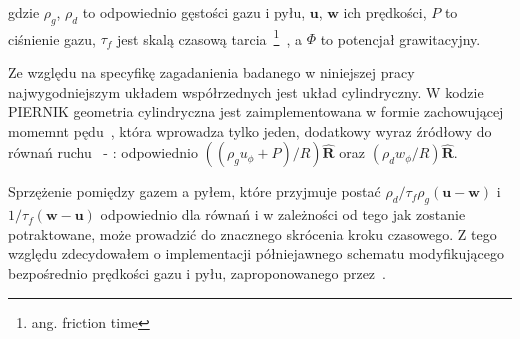 \noindent gdzie $\rho_g$, $\rho_d$ to odpowiednio gęstości gazu i pyłu,
$\mathbf{u}$, $\mathbf{w}$ ich prędkości, $P$ to ciśnienie gazu, $\tau_f$ jest
skalą czasową tarcia~\footnote{ang. friction time}~, a $\Phi$ to
potencjał grawitacyjny.

\par Ze względu na specyfikę zagadanienia badanego w niniejszej pracy
najwygodniejszym układem współrzednych jest układ cylindryczny. W kodzie
PIERNIK geometria cylindryczna jest zaimplementowana w formie zachowującej
momemnt pędu~\cite{M07,SO10}, która wprowadza tylko jeden, dodatkowy wyraz
źródłowy do równań ruchu~ - : odpowiednio
$\left((\rho_g u_\phi + P) / R\right)\mathbf{\hat{R}}$ oraz $(\rho_d w_\phi / R)
\mathbf{\hat{R}}$.
\par Sprzężenie pomiędzy gazem a pyłem, które przyjmuje postać
$\rho_d/\tau_f\rho_g(\mathbf{u}-\mathbf{w})$ i
$1/\tau_f(\mathbf{w}-\mathbf{u})$ odpowiednio dla równań  i 
 w zależności od tego jak zostanie potraktowane, może prowadzić do
 znacznego skrócenia kroku czasowego. Z tego względu zdecydowałem o
 implementacji półniejawnego schematu modyfikującego bezpośrednio prędkości gazu
 i pyłu, zaproponowanego przez~\cite{TB09}.

